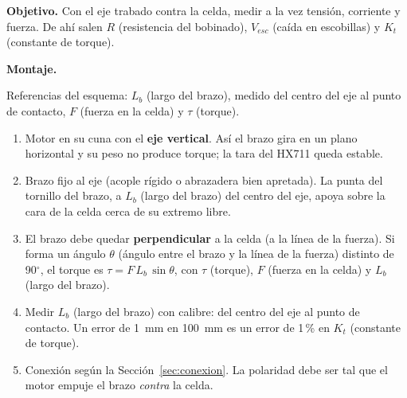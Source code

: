\documentclass[11pt,a4paper]{article}
\begin{document}
\textbf{Objetivo.} Con el eje trabado contra la celda, medir a la vez tensión, corriente y fuerza. De ahí salen $R$ (resistencia del bobinado), $V_{esc}$ (caída en escobillas) y $K_t$ (constante de torque).

\textbf{Montaje.}
\begin{center}
\end{center}
Referencias del esquema: $L_b$ (largo del brazo), medido del centro del eje al punto de contacto, $F$ (fuerza en la celda) y $\tau$ (torque).
\begin{enumerate}
\item Motor en su cuna con el \textbf{eje vertical}. Así el brazo gira en un plano horizontal y su peso no produce torque; la tara del HX711 queda estable.
\item Brazo fijo al eje (acople rígido o abrazadera bien apretada). La punta del tornillo del brazo, a $L_b$ (largo del brazo) del centro del eje, apoya sobre la cara de la celda cerca de su extremo libre.
\item El brazo debe quedar \textbf{perpendicular} a la celda (a la línea de la fuerza). Si forma un ángulo $\theta$ (ángulo entre el brazo y la línea de la fuerza) distinto de 90$^\circ$, el torque es $\tau = F\,L_b\,\sin\theta$, con $\tau$ (torque), $F$ (fuerza en la celda) y $L_b$ (largo del brazo).
\item Medir $L_b$ (largo del brazo) con calibre: del centro del eje al punto de contacto. Un error de 1~mm en 100~mm es un error de 1\,\% en $K_t$ (constante de torque).
\item Conexión según la Sección~\ref{sec:conexion}. La polaridad debe ser tal que el motor empuje el brazo \emph{contra} la celda.
\end{enumerate}
\end{document}
